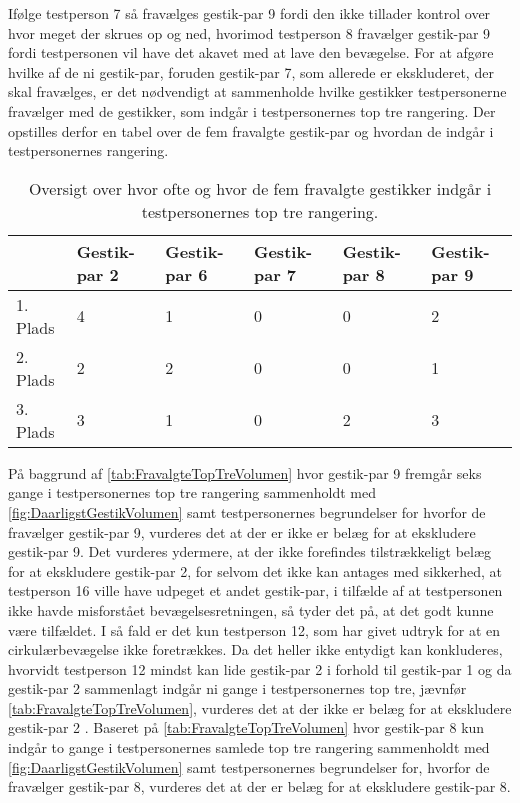 Ifølge testperson 7 så fravælges gestik-par 9 fordi den ikke tillader kontrol over hvor meget der skrues op og ned, hvorimod testperson 8 fravælger gestik-par 9 fordi testpersonen vil have det akavet med at lave den bevægelse.\blankline
%
For at afgøre hvilke af de ni gestik-par, foruden gestik-par 7, som allerede er ekskluderet, der skal fravælges, er det nødvendigt at sammenholde hvilke gestikker testpersonerne fravælger med de gestikker, som indgår i testpersonernes top tre rangering. Der opstilles derfor en tabel over de fem fravalgte gestik-par og hvordan de indgår i testpersonernes rangering.    
%
\begin{table}[H]
	\centering
	\begin{tabular}{ | p{1.5cm} | p{2.1cm} | p{2.1cm} | p{2.1cm} | p{2.1cm} | p{2.1cm} |}
	\hline
		 & Gestik-par 2 & Gestik-par 6 & Gestik-par 7 & Gestik-par 8 & Gestik-par 9 \\ \hline
		1. Plads & 4 & 1 & 0 & 0 & 2\\ \hline
		2. Plads & 2 & 2 & 0 & 0 & 1\\ \hline
		3. Plads & 3 & 1 & 0 & 2 & 3\\ \hline
	\end{tabular}
	\caption{Oversigt over hvor ofte og hvor de fem fravalgte gestikker indgår i testpersonernes top tre rangering.}
	\label{tab:FravalgteTopTreVolumen}
\end{table}
\noindent
%
På baggrund af \autoref{tab:FravalgteTopTreVolumen} hvor gestik-par 9 fremgår seks gange i testpersonernes top tre rangering sammenholdt med \autoref{fig:DaarligstGestikVolumen} samt testpersonernes begrundelser for hvorfor de fravælger gestik-par 9, vurderes det at der er ikke er belæg for at ekskludere gestik-par 9. Det vurderes ydermere, at der ikke forefindes tilstrækkeligt belæg for at ekskludere gestik-par 2, for selvom det ikke kan antages med sikkerhed, at testperson 16 ville have udpeget et andet gestik-par, i tilfælde af at testpersonen ikke havde misforstået bevægelsesretningen, så tyder det på, at det godt kunne være tilfældet. I så fald er det kun testperson 12, som har givet udtryk for at en cirkulærbevægelse ikke foretrækkes. Da det heller ikke entydigt kan konkluderes, hvorvidt testperson 12 mindst kan lide gestik-par 2 i forhold til gestik-par 1 og da gestik-par 2 sammenlagt indgår ni gange i testpersonernes top tre, jævnfør \autoref{tab:FravalgteTopTreVolumen}, vurderes det at der ikke er belæg for at ekskludere gestik-par 2 .
%
Baseret på \autoref{tab:FravalgteTopTreVolumen} hvor gestik-par 8 kun indgår to gange i testpersonernes samlede top tre rangering sammenholdt med \autoref{fig:DaarligstGestikVolumen} samt testpersonernes begrundelser for, hvorfor de fravælger gestik-par 8, vurderes det at der er belæg for at ekskludere gestik-par 8. 

